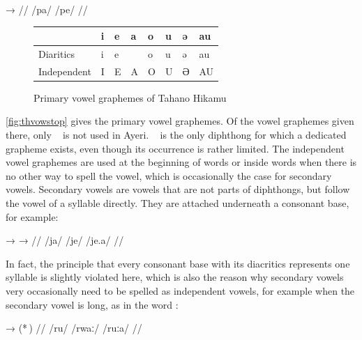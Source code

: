 \pex[lingstyle=thex]\begingl
	\gla {}	→	 //
	\glb /pa/	{}	/pe/ //
\endgl\xe

\begin{figure}[th]
\caption{Primary vowel graphemes of Tahano Hikamu}

\begin{tabu} to \linewidth{H[c] X[c] X[c] X[c] X[c] X[c] X[c] X[c]}
\toprule
\tableheaderfont

	& i
	& e
	& a
	& o
	& u
	& ə
	& au
	\\
	
\toprule
	
Diaritics
	& \Tagati\huge *i
	& \Tagati\huge *e
	& \Tagati\huge {}
	& \Tagati\huge *o
	& \Tagati\huge *u
	& \Tagati\huge *ə
	& \Tagati\huge *au
	\\

\midrule

Independent
	& \Tagati\huge I
	& \Tagati\huge E
	& \Tagati\huge A
	& \Tagati\huge O
	& \Tagati\huge U
	& \Tagati\huge Ə
	& \Tagati\huge AU
	\\

\bottomrule
\end{tabu}
\label{fig:thvowstop}
\end{figure}

\autoref{fig:thvowstop} gives the primary vowel graphemes. Of the vowel 
graphemes given there, only ~ is not used in Ayeri. 
~ is the only diphthong for which a dedicated grapheme 
exists, even though its occurrence is rather limited. The independent vowel 
graphemes are used at the beginning of words or inside words when there is no 
other way to spell the vowel, which is occasionally the case for secondary 
vowels. Secondary vowels are vowels that are not parts of diphthongs, but follow 
the vowel of a syllable directly. They are attached underneath a consonant base, 
for example:

\pex[lingstyle=thex]\begingl
	\gla {}	→		→	 //
	\glb /ja/	{}	/je/		{}	/je.a/ //
\endgl\xe

In fact, the principle that every consonant base with its diacritics represents 
one syllable is slightly violated here, which is also the reason why secondary 
vowels very occasionally need to be spelled as independent vowels, for example 
when the secondary vowel is long, as in the word :

\pex[lingstyle=thex]\label{ex:rwaa}\begingl
	\gla {}	→		\quad	(*\,) //
	\glb /ru/	{}	/rwaː/ 		\quad	*/ruːa/ //
\endgl\xe

